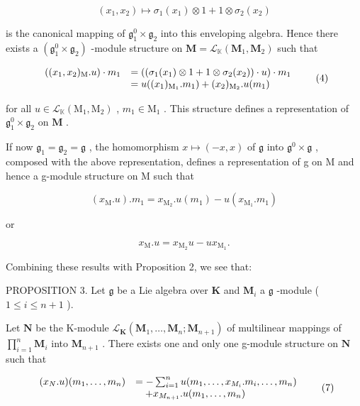 \[
(x _ {1}, x _ {2}) \mapsto \sigma_ {1} (x _ {1}) \otimes 1 + 1 \otimes \sigma_ {2} (x _ {2})
\]

is the canonical mapping of \(\mathfrak{g}_1^0\times \mathfrak{g}_2\) into this enveloping algebra. Hence there exists a \((\mathfrak{g}_1^0\times \mathfrak{g}_2)\) -module structure on \(\mathbf{M} = \mathcal{L}_{\mathbb{K}}(\mathbf{M}_1,\mathbf{M}_2)\) such that

\[
\begin{array}{r l} ((x _ {1}, x _ {2}) _ {\mathrm{M}}. u) \cdot m _ {1} & = ((\sigma_ {1} (x _ {1}) \otimes 1 + 1 \otimes \sigma_ {2} (x _ {2})) \cdot u) \cdot m _ {1} \\ & = u ((x _ {1}) _ {\mathrm{M} _ {1}}. m _ {1}) + (x _ {2}) _ {\mathrm{M} _ {2}}. u (m _ {1}) \end{array}\tag{4}
\]

for all \(u \in \mathcal{L}_{\mathbb{K}}(\mathrm{M}_1, \mathrm{M}_2)\) , \(m_1 \in \mathrm{M}_1\) . This structure defines a representation of \(\mathfrak{g}_1^0 \times \mathfrak{g}_2\) on \(\mathbf{M}\) .

If now \(\mathfrak{g}_1 = \mathfrak{g}_2 = \mathfrak{g}\) , the homomorphism \(x \mapsto (-x, x)\) of \(\mathfrak{g}\) into \(\mathfrak{g}^0 \times \mathfrak{g}\) , composed with the above representation, defines a representation of g on M and hence a g-module structure on M such that

\[
(x _ {\mathrm{M}}. u). m _ {1} = x _ {\mathrm{M} _ {2}}. u (m _ {1}) - u (x _ {\mathrm{M} _ {1}}. m _ {1})\tag{5}
\]

or

\[
x _ {\mathrm{M}}. u = x _ {\mathrm{M} _ {2}} u - u x _ {\mathrm{M} _ {1}}.\tag{6}
\]

Combining these results with Proposition 2, we see that:

PROPOSITION 3. Let \(\mathfrak{g}\) be a Lie algebra over \(\mathbf{K}\) and \(\mathbf{M}_i\) a \(\mathfrak{g}\) -module ( \(1 \leqslant i \leqslant n + 1\) ).

Let \(\mathbf{N}\) be the K-module \(\mathcal{L}_{\mathbf{K}}(\mathbf{M}_1, \ldots, \mathbf{M}_n; \mathbf{M}_{n+1})\) of multilinear mappings of \(\prod_{i=1}^{n} \mathbf{M}_i\) into \(\mathbf{M}_{n+1}\) . There exists one and only one g-module structure on \(\mathbf{N}\) such that

\[
\begin{array}{r l} (x _ {N}. u) (m _ {1}, \ldots , m _ {n}) & = - \sum_ {i = 1} ^ {n} u (m _ {1}, \ldots , x _ {M _ {i}}. m _ {i}, \ldots , m _ {n}) \\ & \quad + x _ {M _ {n + 1}}. u (m _ {1}, \ldots , m _ {n}) \end{array}\tag{7}
\]

